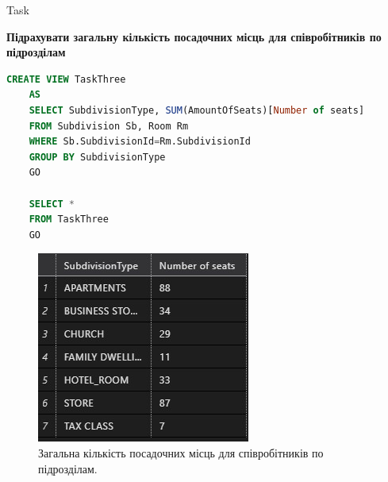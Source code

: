 \documentclass[a4paper,12pt]{article}
\newcommand{\RomanNumeralCaps}[1]{\MakeUppercase{\romannumeral #1}}
\begin{document}
\newpage
	\begin{center}
        \Large{Task \RomanNumeralCaps{3}}
    \end{center}
	\textbf{Підрахувати загальну кількість посадочних місць для співробітників по підрозділам}
	\begin{lstlisting}[language=SQL]
	CREATE VIEW TaskThree
	AS
	SELECT SubdivisionType, SUM(AmountOfSeats)[Number of seats]
	FROM Subdivision Sb, Room Rm
	WHERE Sb.SubdivisionId=Rm.SubdivisionId
	GROUP BY SubdivisionType
	GO
	
	SELECT * 
	FROM TaskThree
	GO
	\end{lstlisting}
	\begin{figure}[h!]
		\begin{minipage}[h]{1\linewidth}
			\centering
			\includegraphics[width=0.7\linewidth]{Prt sc/Figure_4.jpg}  
		\end{minipage}
		\caption{Загальна кількість посадочних місць для співробітників по підрозділам.}
	\end{figure}
\end{document}
